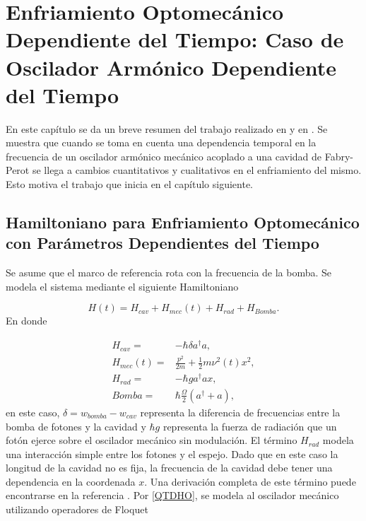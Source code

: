 \documentclass[10pt,a4paper]{report}
\begin{document}
\chapter{Enfriamiento Optomecánico Dependiente del Tiempo: Caso de Oscilador Armónico Dependiente del Tiempo}

En este capítulo se da un breve resumen del trabajo realizado en \cite{TesisMaestria} y en \cite{YanesOC}. Se muestra que  cuando se toma en cuenta una dependencia temporal en la frecuencia  de un oscilador armónico mecánico acoplado a una cavidad de Fabry-Perot se llega a cambios cuantitativos y cualitativos en el enfriamiento del mismo. Esto motiva el trabajo que inicia en el capítulo siguiente.


\section{Hamiltoniano para Enfriamiento Optomecánico con Parámetros Dependientes del Tiempo}

 Se asume que el
marco de referencia rota con la frecuencia de la bomba. Se modela el
sistema mediante el siguiente Hamiltoniano\cite{BarberisLC}

\begin{equation}
H(t) = H_{cav} + H_{mec}(t) + H_{rad} + H_{Bomba}.
\end{equation} En donde

\begin{align}
H_{cav} =& -\hbar \delta a^\dagger a,\\
H_{mec}(t) =& \frac{p^2}{2m} + \frac{1}{2}m \nu^2 (t) x^2,\\
H_{rad} =& -\hbar g a^\dagger a x,\\
Bomba =& \hbar\frac{\Omega}{2}(a^\dagger + a),
\end{align} en este caso, $\delta = w_{bomba} - w_{cav}$ representa la diferencia de frecuencias entre la bomba de fotones y la cavidad y $\hbar g$ representa la fuerza de radiación que un fotón ejerce sobre el oscilador mecánico sin modulación. El término $H_{rad}$ modela una interacción simple entre los fotones y el espejo. Dado que en este caso la longitud de la cavidad no es fija, la frecuencia de la cavidad debe tener una dependencia en la coordenada $x$. Una derivación completa de este término puede encontrarse en la referencia \cite{KippenberCO}. Por \eqref{QTDHO}, se modela al oscilador mecánico utilizando operadores de Floquet
\end{document}
